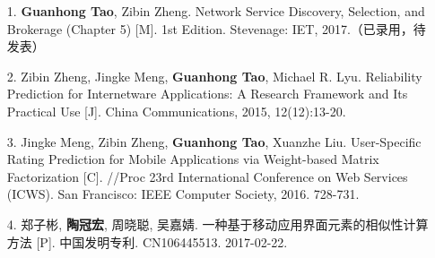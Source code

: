 \documentclass{sysuthesis} %
\numberwithin{algorithm}{chapter}
\theoremstyle{plain}
\theoremstyle{definition}
\theoremstyle{definition}
\begin{document}
\begin{Resume}
\begin{itemize}
\item [1.] \textbf{Guanhong Tao}, Zibin Zheng. Network Service Discovery, Selection, and Brokerage (Chapter 5) [M]. 1st Edition. Stevenage: IET, 2017.（已录用，待发表）
\item [2.] Zibin Zheng, Jingke Meng, \textbf{Guanhong Tao}, Michael R. Lyu. Reliability Prediction for Internetware Applications: A Research Framework and Its Practical Use [J]. China Communications, 2015, 12(12):13-20.
\item [3.] Jingke Meng, Zibin Zheng, \textbf{Guanhong Tao}, Xuanzhe Liu. User-Specific Rating Prediction for Mobile Applications via Weight-based Matrix Factorization [C]. //Proc 23rd International Conference on Web Services (ICWS). San Francisco: IEEE Computer Society, 2016. 728-731.
\item [4.] 郑子彬, \textbf{陶冠宏}, 周晓聪, 吴嘉婧. 一种基于移动应用界面元素的相似性计算方法 [P]. 中国发明专利. CN106445513. 2017-02-22.
\end{itemize}
\end{Resume}
\end{document}
